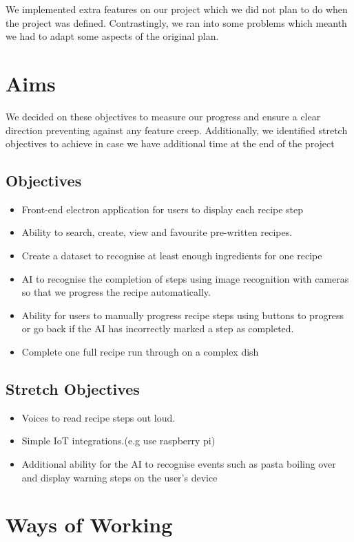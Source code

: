 \documentclass{article}
\begin{document}
We implemented extra features on our project which we did not plan to do when the project was defined. Contrastingly, we ran into some problems which meanth we had to adapt some aspects of the original plan.

    

    \section{Aims}
    We decided on these objectives to measure our progress and ensure a clear direction preventing against any feature creep. Additionally, we identified stretch objectives to achieve in case we have additional time at the end of the project
    \subsection{Objectives}
    \begin{itemize}
          \item {Front-end electron application for users to display each recipe step}
          \item {Ability to search, create, view and favourite pre-written recipes.}
          \item {Create a dataset to recognise at least enough ingredients for one recipe}
          \item {AI to recognise the completion of steps using image recognition with cameras so that we progress the recipe automatically.}
          \item {Ability for users to manually progress recipe steps using buttons to progress or go back if the AI has incorrectly marked a step as completed.}
          \item { Complete one full recipe run through on a complex dish}
    \end{itemize}
    \subsection{Stretch Objectives }
    \begin{itemize}
        \item {Voices to read recipe steps out loud.}
        \item {Simple IoT integrations.(e.g use raspberry pi)}
        \item { Additional ability for the AI to recognise events such as pasta boiling over and display warning steps on the user’s device}
    \end{itemize}
    \section{Ways of Working}
\end{document}
